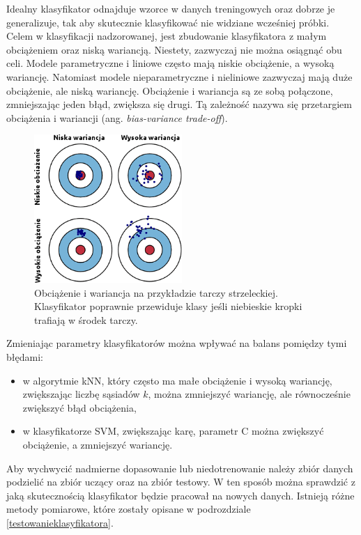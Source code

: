 Idealny klasyfikator odnajduje wzorce w danych treningowych oraz dobrze je generalizuje, tak aby skutecznie klasyfikować nie widziane wcześniej próbki. Celem w klasyfikacji nadzorowanej, jest zbudowanie klasyfikatora z małym obciążeniem oraz niską wariancją. Niestety, zazwyczaj nie można osiągnąć obu celi. Modele parametryczne i liniowe często mają niskie obciążenie, a wysoką wariancję. Natomiast modele nieparametryczne i nieliniowe zazwyczaj mają duże obciążenie, ale niską wariancję. Obciążenie i wariancja są ze sobą połączone, zmniejszając jeden błąd, zwiększa się drugi. Tą zależność nazywa się przetargiem obciążenia i wariancji (ang. \textit{bias-variance trade-off}).
\begin{figure}[H]
	\centering
	\includegraphics[width=0.5\textwidth]{./images/biasvariance.png}
	\caption[Rysunek wariancji i obciążenia]{Obciążenie i wariancja na przykładzie tarczy strzeleckiej. Klasyfikator poprawnie przewiduje klasy jeśli niebieskie kropki trafiają w środek tarczy.}
	\label{fig:biasvariance}
\end{figure}
Zmieniając parametry klasyfikatorów można wpływać na balans pomiędzy tymi błędami:
\begin{itemize}
	\item w algorytmie kNN, który często ma małe obciążenie i wysoką wariancję, zwiększając liczbę sąsiadów $k$, można zmniejszyć wariancję, ale równocześnie zwiększyć błąd obciążenia,
	\item w klasyfikatorze SVM, zwiększając karę, parametr C można zwiększyć obciążenie, a zmniejszyć wariancję.
\end{itemize}
Aby wychwycić nadmierne dopasowanie lub niedotrenowanie należy zbiór danych podzielić na zbiór uczący oraz na zbiór testowy. W ten sposób można sprawdzić z jaką skutecznością klasyfikator będzie pracował na nowych danych. Istnieją różne metody pomiarowe, które zostały opisane w podrozdziale \ref{testowanieklasyfikatora}.

